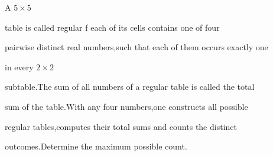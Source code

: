 A $5 \times 5$

 table is called regular f each of its cells contains one of four 

pairwise distinct real numbers,such that each of them occurs exactly one

 in every $2 \times 2$

 subtable.The sum of all numbers of a regular table is called the total 

sum of the table.With any four numbers,one constructs all possible 

regular tables,computes their total sums and counts the distinct 

outcomes.Determine the maximum possible count.